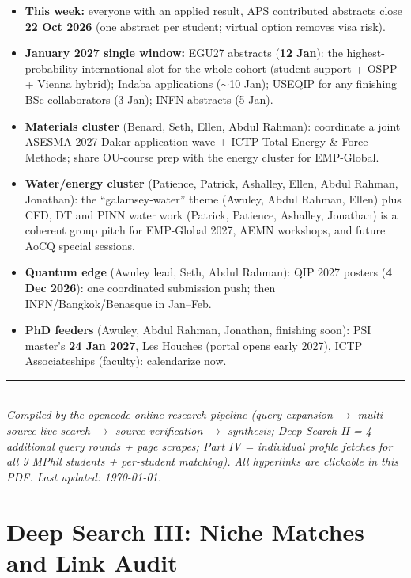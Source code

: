 \documentclass[11pt,a4paper]{article}
\begin{document}
\begin{itemize}[leftmargin=1.4em]
  \item \textbf{This week:} everyone with an applied result, APS contributed abstracts close \textbf{22 Oct 2026} (one abstract per student; virtual option removes visa risk).
  \item \textbf{January 2027 single window:} EGU27 abstracts (\textbf{12 Jan}): the highest-probability international slot for the whole cohort (student support + OSPP + Vienna hybrid); Indaba applications ($\sim$10 Jan); USEQIP for any finishing BSc collaborators (3 Jan); INFN abstracts (5 Jan).
  \item \textbf{Materials cluster} (Benard, Seth, Ellen, Abdul Rahman): coordinate a joint ASESMA-2027 Dakar application wave + ICTP Total Energy \& Force Methods; share OU-course prep with the energy cluster for EMP-Global.
  \item \textbf{Water/energy cluster} (Patience, Patrick, Ashalley, Ellen, Abdul Rahman, Jonathan): the ``galamsey-water'' theme (Awuley, Abdul Rahman, Ellen) plus CFD, DT and PINN water work (Patrick, Patience, Ashalley, Jonathan) is a coherent group pitch for EMP-Global 2027, AEMN workshops, and future AoC\textbar Q special sessions.
  \item \textbf{Quantum edge} (Awuley lead, Seth, Abdul Rahman): QIP 2027 posters (\textbf{4 Dec 2026}): one coordinated submission push; then INFN/Bangkok/Benasque in Jan--Feb.
  \item \textbf{PhD feeders} (Awuley, Abdul Rahman, Jonathan, finishing soon): PSI master's \textbf{24 Jan 2027}, Les Houches (portal opens early 2027), ICTP Associateships (faculty): calendarize now.
\end{itemize}

\bigskip
\noindent\rule{\textwidth}{0.4pt}\\
\small\emph{Compiled by the opencode online-research pipeline (query expansion $\rightarrow$ multi-source live search $\rightarrow$ source verification $\rightarrow$ synthesis; Deep Search II = 4 additional query rounds + page scrapes; Part IV = individual profile fetches for all 9 MPhil students + per-student matching). All hyperlinks are clickable in this PDF. Last updated: \today.}



\newpage
\part{Deep Search III: Niche Matches and Link Audit}
\label{part:deep3}
\end{document}
